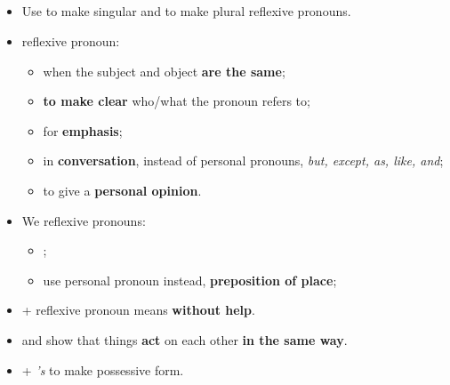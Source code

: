 \subsection{}
\begin{itemize}
    \item[\doot] Use  to make singular and  to make plural reflexive pronouns.
    \item[\doot]  reflexive pronoun:
    \begin{itemize}
        \item[\daash] when the subject and object \textbf{are the same};
        \item[\daash] \textbf{to make clear} who/what the pronoun refers to;
        \item[\daash] for \textbf{emphasis};
        \item[\daash] in \textbf{conversation}, instead of personal pronouns,
         \textit{but, except, as, like, and};
        \item[\daash]  to give a \textbf{personal opinion}.
    \end{itemize}
    \item[\doot] We  reflexive pronouns:
    \begin{itemize}
        \item[\daash]  ;
        \item[\daash] use personal pronoun instead,  \textbf{preposition of place};
    \end{itemize}
    \item[\doot]  + reflexive pronoun means \textbf{without help}.
    \item[\doot]  and  show
    that things \textbf{act} on each other \textbf{in the same way}.
    \item[\doot]  + \textit{'s} to make possessive form.
\end{itemize}